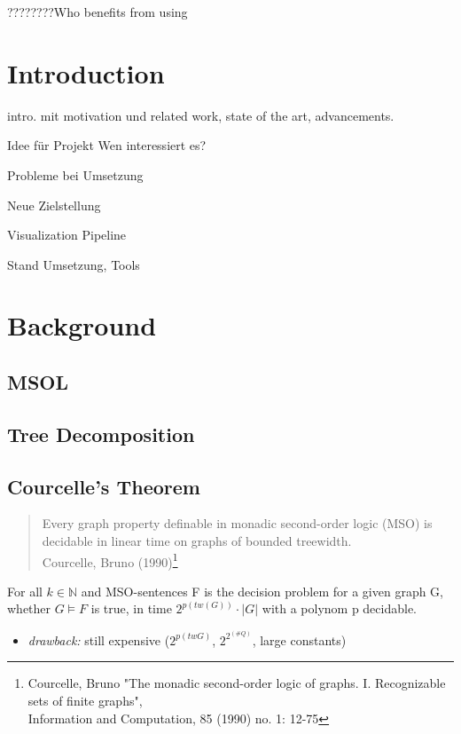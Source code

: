 \documentclass[a4paper, 12pt]{scrartcl}
\begin{document}
????????Who benefits from using

\newpage

\tableofcontents

\newpage


\section{Introduction}
intro. mit motivation und related work, state of the art, advancements.

Idee für Projekt 
Wen interessiert es?

Probleme bei Umsetzung

Neue Zielstellung

Visualization Pipeline

Stand Umsetzung, Tools

\newpage
\section{Background}
\subsection{MSOL}
\subsection{Tree Decomposition}
\subsection{Courcelle's Theorem}
\begin{quotation}
	Every graph property definable in monadic second-order logic (MSO) is decidable in linear time on graphs of bounded treewidth.\\
	{\small Courcelle, Bruno (1990)}\footnote{Courcelle, Bruno "The monadic second-order logic of graphs. I. Recognizable sets of finite graphs",\\ Information and Computation, 85 (1990) no. 1: 12-75}
\end{quotation}

For all $k \in \mathbb{N}$ and MSO-sentences F is the decision problem for a given graph G, whether $G \models F$ is true, in time $2^{p(tw(G))} \cdot |G|$ with a polynom p decidable.
\begin{itemize}
	
	\item \emph{drawback:} still expensive ($2^{p(tw G)}$, $2^{2^{(\#Q)}}$, large constants) \smallskip 

\end{itemize}
\end{document}

